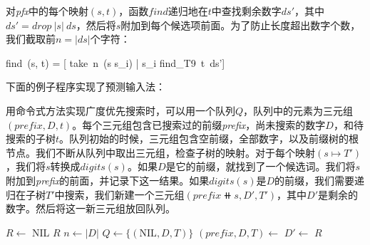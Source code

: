 \documentclass[b5paper]{ctexart}
\begin{document}
对\textit{pfx}中的每个映射$(s, t)$，函数$find$递归地在$t$中查找剩余数字$ds'$，其中$ds' = drop\ |s|\ ds$，然后将$s$附加到每个候选项前面。为了防止长度超出数字个数，我们截取前$n = |ds|$个字符：

\be
find\ (s, t) = [ take\ n\ (s \doubleplus s_i) | s_i \in find_{T9}\ t\ ds']
\ee

下面的例子程序实现了预测输入法：


用命令式方法实现广度优先搜索时，可以用一个队列$Q$，队列中的元素为三元组$(\textit{prefix}, D, t)$。每个三元组包含已搜索过的前缀\textit{prefix}，尚未搜索的数字$D$，和待搜索的子树$t$。队列初始的时候，三元组包含空前缀，全部数字，以及前缀树的根节点。我们不断从队列中取出三元组，检查子树的映射。对于每个映射$(s \mapsto T')$，我们将$s$转换成$digits(s)$。如果$D$是它的前缀，就找到了一个候选词。我们将$s$附加到\textit{prefix}的前面，并记录下这一结果。如果$digits(s)$是$D$的前缀，我们需要递归在子树$T'$中搜索，我们新建一个三元组$(\textit{prefix} \doubleplus s, D', T')$，其中$D'$是剩余的数字。然后将这一新三元组放回队列。

\begin{algorithmic}[1]
  \State $R \gets $ NIL
    \State \Return $R$
  \EndIf
  \State $n \gets |D|$
  \State $Q \gets \{(, D, T)\}$
    \State $(\textit{prefix}, D, T) \gets$ 
      \State $D' \gets$ 
       
        \State {} 
        \State {}
      \EndIf
    \EndFor
  \EndWhile
  \State \Return $R$
\EndFunction
\end{algorithmic}

\begin{Exercise}
\end{Exercise}
\end{document}
